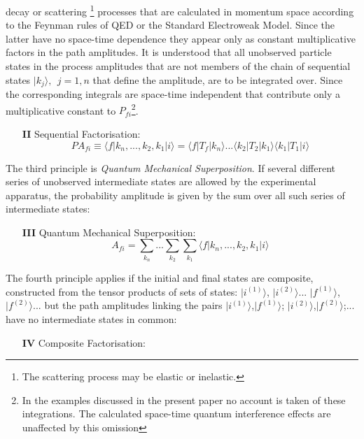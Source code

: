 \documentclass [12pt]{article}
\begin{document}
{    decay or scattering \footnote{The scattering process may be elastic or inelastic.} processes
     that are calculated in momentum space according to the Feynman rules of QED or the
     Standard Electroweak Model. Since the latter have no space-time dependence they appear only
    as constant multiplicative factors in the path amplitudes. It is understood that all unobserved
    particle states in the process amplitudes that are not members of the chain
    of sequential states $|k_j\rangle,~~j=1,n$ that define the amplitude, are to be integrated over.
    Since the corresponding integrals are space-time independent that contribute only a 
    multiplicative constant to $P_{fi}$\footnote{In the examples discussed in the present 
   paper no account is taken of these integrations. The calculated space-time quantum interference
   effects are unaffected by this omission}.  
 \begin{itemize}
  \item[{\bf II}] Sequential Factorisation: 
   \begin{equation}
   PA_{fi} \equiv \langle f|k_n,...,k_2,k_1|i \rangle = \langle f |T_f|k_n\rangle...
    \langle k_2 |T_2|k_1\rangle \langle k_1 |T_1|i\rangle 
   \end{equation}
 \end{itemize}
    \par The third principle is {\it Quantum Mechanical Superposition}. If several different series of
    unobserved intermediate states are allowed by the experimental apparatus, the 
   probability amplitude is given
    by the sum over all such series of intermediate states:
 \begin{itemize}
  \item[{\bf III}]  Quantum Mechanical Superposition:
   \begin{equation}
    A_{fi} = \sum_{k_n}...\sum_{k_2}\sum_{k_1} \langle f|k_n,...,k_2,k_1|i \rangle
    \end{equation}
 \end{itemize} 
    \par The fourth principle applies if the initial and final states are composite,
  constructed from the tensor products of sets
 of states: $|i^{(1)}\rangle$, $|i^{(2)}\rangle$...
    $|f^{(1)}\rangle$, $|f^{(2)}\rangle$... but the path amplitudes linking the pairs 
    $|i^{(1)}\rangle$,$|f^{(1)}\rangle$; $|i^{(2)}\rangle$,$|f^{(2)}\rangle$;... have no intermediate
    states in common:
  \begin{itemize}
  \item[{\bf IV}]  Composite Factorisation:

\end{itemize}}
\end{document}

